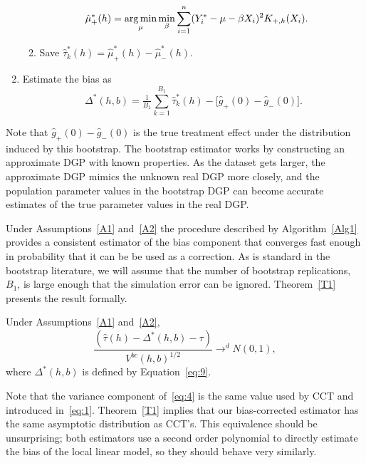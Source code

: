 \documentclass[12pt,fleqn]{article}
\begin{document}
\begin{algorithm}
\begin{enumerate}
\begin{enumerate}
\begin{align*}
        \hat\mu_+^*(h)
        &= \operatorname*{arg\,min}_{\mu} \min_{\beta} \sum_{i = 1}^n
          (Y_i^* - \mu - \beta X_i)^2 K_{+,h}(X_{i}).
      \end{align*}
    \item Save $\hat\tau^*_k(h) = \hat\mu_+^*(h) - \hat\mu_-^*(h)$.
    \end{enumerate}
  \item Estimate the bias as
    \begin{equation}
      \label{eq:9}
      \Delta^*(h,b) = \tfrac{1}{B_1} \sum_{k=1}^{B_1} \hat\tau^*_k(h) -
      \big[\hat g_+(0) - \hat g_-(0)\big].
    \end{equation}
  \end{enumerate}
\end{algorithm}
Note that $\hat g_+(0) - \hat g_-(0)$ is the true treatment effect under the
distribution induced by this bootstrap. The bootstrap estimator works by
constructing an approximate DGP with known properties. As the dataset gets
larger, the approximate DGP mimics the unknown real DGP more closely, and the
population parameter values in the bootstrap DGP can become accurate estimates
of the true parameter values in the real DGP.

Under Assumptions~\ref{A1} and~\ref{A2} the procedure described by
Algorithm~\ref{Alg1} provides a consistent estimator of the bias component that
converges fast enough in probability that it can be be used as a correction. As
is standard in the bootstrap literature, we will assume that the number of
bootstrap replications, $B_{1}$, is large enough that the simulation error can
be ignored. Theorem~\ref{T1} presents the result formally.

\begin{theorem}\label{T1}
  Under Assumptions~\ref{A1} and~\ref{A2},
\begin{equation}
  \label{eq:4}
  \frac{(\hat\tau(h) - \Delta^{*}(h,b) - \tau)}{ V^{bc}(h, b)^{1/2}}
  \to^{d} N(0,1),
\end{equation}
where $\Delta^*(h,b)$ is defined by Equation~\eqref{eq:9}.
\end{theorem}

Note that the variance component of~\eqref{eq:4} is the same value used by CCT
and introduced in~\eqref{eq:1}. Theorem~\ref{T1} implies that our bias-corrected
estimator has the same asymptotic distribution as CCT's. This equivalence should
be unsurprising; both estimators use a second order polynomial to directly estimate
the bias of the local linear model, so they should behave very similarly.
\end{document}
